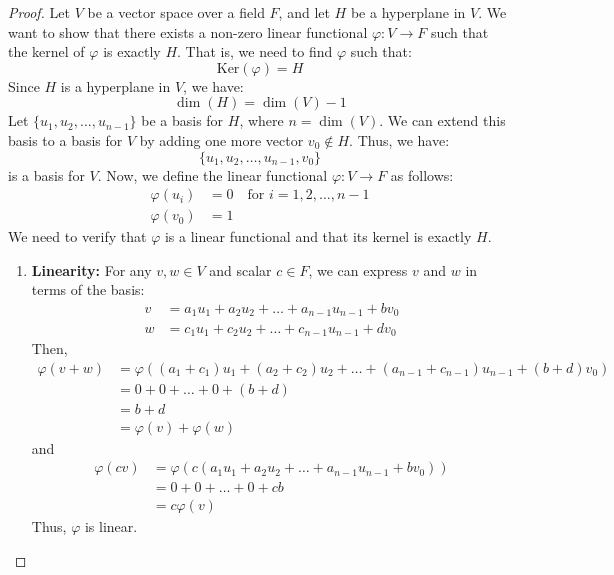 \documentclass[openany]{book}
\begin{document}
\begin{proof}
Let $V$ be a vector space over a field $F$, and let $H$ be a hyperplane in $V$. We want to show that there exists a non-zero linear functional $\varphi: V \to F$ such that the kernel of $\varphi$ is exactly $H$. That is, we need to find $\varphi$ such that:
$$\text{Ker}(\varphi) = H$$
Since $H$ is a hyperplane in $V$, we have:
$$\dim(H) = \dim(V) - 1$$
Let $\{u_1, u_2, \ldots, u_{n-1}\}$ be a basis for $H$, where $n = \dim(V)$. We can extend this basis to a basis for $V$ by adding one more vector $v_0 \notin H$. Thus, we have:
$$\{u_1, u_2, \ldots, u_{n-1}, v_0\}$$
is a basis for $V$. Now, we define the linear functional $\varphi: V \to F$ as follows:
\[\begin{aligned}
\varphi(u_i) &= 0 \quad \text{for } i = 1, 2, \ldots, n-1 \\
\varphi(v_0) &= 1
\end{aligned}\]
We need to verify that $\varphi$ is a linear functional and that its kernel is exactly $H$.
\begin{enumerate}
    \item \textbf{Linearity:} For any $v, w \in V$ and scalar $c \in F$, we can express $v$ and $w$ in terms of the basis:
    \[\begin{aligned}
    v &= a_1 u_1 + a_2 u_2 + \ldots + a_{n-1} u_{n-1} + b v_0 \\
    w &= c_1 u_1 + c_2 u_2 + \ldots + c_{n-1} u_{n-1} + d v_0
    \end{aligned}\]
    Then,
    \[\begin{aligned}
    \varphi(v + w) &= \varphi((a_1 + c_1) u_1 + (a_2 + c_2) u_2 + \ldots + (a_{n-1} + c_{n-1}) u_{n-1} + (b + d) v_0) \\
    &= 0 + 0 + \ldots + 0 + (b + d) \\
    &= b + d \\
    &= \varphi(v) + \varphi(w)
    \end{aligned}\]
    and
    \[\begin{aligned}
    \varphi(cv) &= \varphi(c(a_1 u_1 + a_2 u_2 + \ldots + a_{n-1} u_{n-1} + b v_0)) \\
    &= 0 + 0 + \ldots + 0 + cb \\
    &= c\varphi(v)
    \end{aligned}\]
    Thus, $\varphi$ is linear.
    

\end{enumerate}
\end{proof}
\end{document}
